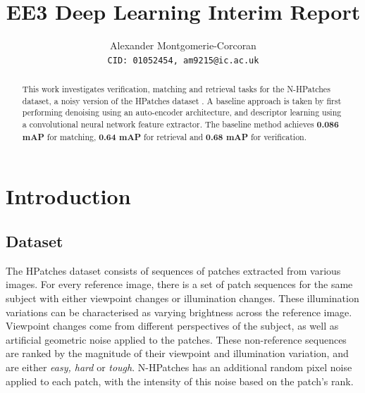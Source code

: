 \documentclass[10pt,twocolumn,letterpaper]{article}
\begin{document}
\vspace{-0.5cm}


\title{EE3 Deep Learning Interim Report}
\vspace{-0.5cm}

\author{Alexander Montgomerie-Corcoran\\
{\tt\small CID: 01052454, am9215@ic.ac.uk}
}

\maketitle
\vspace{-0.3cm}


\begin{abstract}

   This work investigates verification, matching and retrieval tasks for the N-HPatches dataset, a noisy version of the HPatches dataset \cite{hpatches_2017_cvpr}.
   A baseline approach is taken by first performing denoising using an auto-encoder architecture, and descriptor learning using a convolutional neural network feature extractor. The baseline method achieves \textbf{0.086 mAP} for matching, \textbf{0.64 mAP} for retrieval and \textbf{0.68 mAP} for verification.
\end{abstract}

\vspace{-0.7cm}

\section{Introduction}

\vspace{-0.2cm}
\subsection{Dataset}
\vspace{-0.2cm}

The HPatches dataset consists of sequences of patches extracted from various images. For every reference image, there is a set of patch sequences for the same subject with either viewpoint changes or illumination changes. These illumination variations can be characterised as varying brightness across the reference image. Viewpoint changes come from different perspectives of the subject, as well as artificial geometric noise applied to the patches. These non-reference sequences are ranked by the magnitude of their viewpoint and illumination variation, and are either \textit{easy, hard} or \textit{tough}. N-HPatches has an additional random pixel noise applied to each patch, with the intensity of this noise based on the patch's rank.
\vspace{-0.2cm}
\end{document}
